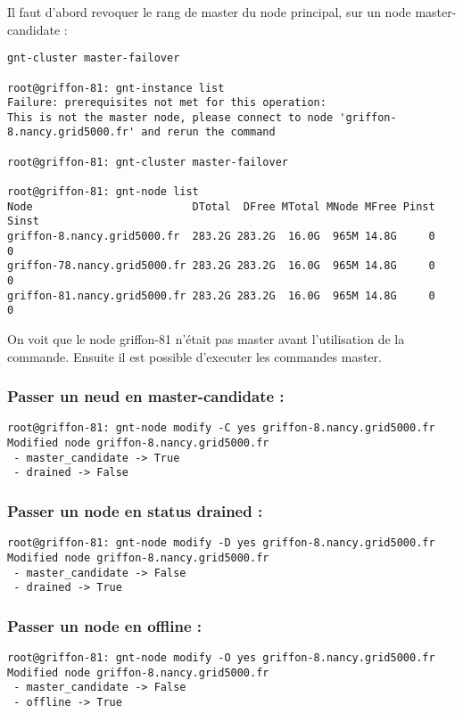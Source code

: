 Il faut d'abord revoquer le rang de master du node principal, sur un node master-candidate :
\begin{lstlisting}
gnt-cluster master-failover

root@griffon-81: gnt-instance list
Failure: prerequisites not met for this operation:
This is not the master node, please connect to node 'griffon-8.nancy.grid5000.fr' and rerun the command

root@griffon-81: gnt-cluster master-failover

root@griffon-81: gnt-node list
Node                         DTotal  DFree MTotal MNode MFree Pinst Sinst
griffon-8.nancy.grid5000.fr  283.2G 283.2G  16.0G  965M 14.8G     0     0
griffon-78.nancy.grid5000.fr 283.2G 283.2G  16.0G  965M 14.8G     0     0
griffon-81.nancy.grid5000.fr 283.2G 283.2G  16.0G  965M 14.8G     0     0
\end{lstlisting}
On voit que le node griffon-81 n'était pas master avant l'utilisation de la commande. Ensuite il est possible d'executer les commandes master.

\subsubsection {Passer un neud en master-candidate :}
\begin{lstlisting}
root@griffon-81: gnt-node modify -C yes griffon-8.nancy.grid5000.fr
Modified node griffon-8.nancy.grid5000.fr
 - master_candidate -> True
 - drained -> False
\end{lstlisting}
\subsubsection {Passer un node en status drained :}
\begin{lstlisting}
root@griffon-81: gnt-node modify -D yes griffon-8.nancy.grid5000.fr
Modified node griffon-8.nancy.grid5000.fr
 - master_candidate -> False
 - drained -> True
\end{lstlisting}
\subsubsection {Passer un node en offline :}
\begin{lstlisting}
root@griffon-81: gnt-node modify -O yes griffon-8.nancy.grid5000.fr
Modified node griffon-8.nancy.grid5000.fr
 - master_candidate -> False
 - offline -> True
\end{lstlisting}
